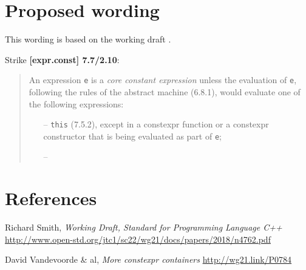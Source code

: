 \documentclass{wg21}
\begin{document}
\section{Proposed wording}
This wording is based on the working draft \cite{N4762}.

Strike \textbf{[expr.const] 7.7/2.10}:

\begin{quote}
An expression \texttt{e} is a \textit{core constant expression} unless the
evaluation of \texttt{e}, following the rules of the abstract machine (6.8.1),
would evaluate one of the following expressions:

\begin{itemize}
  \item[--] \texttt{this} (7.5.2), except in a constexpr function or a constexpr
            constructor that is being evaluated as part of \texttt{e};
  \newline
  [...]
  \item [--] 
\end{itemize}
\end{quote}


\section{References}
\renewcommand{\section}[2]{}%
\begin{thebibliography}{9}

  Richard Smith,
  \emph{Working Draft, Standard for Programming Language C++}\newline
  \url{http://www.open-std.org/jtc1/sc22/wg21/docs/papers/2018/n4762.pdf}

  David Vandevoorde \& al,
  \emph{More constexpr containers}\newline
  \url{http://wg21.link/P0784}

\end{thebibliography}
\end{document}
